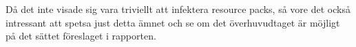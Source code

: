 \documentclass[journal,comsoc]{IEEEtran}
\begin{document}
Då det inte visade sig vara triviellt att infektera resource packs, så vore det också intressant att spetsa just detta ämnet och se om det överhuvudtaget är möjligt på det sättet föreslaget i rapporten. 

%
%



%
%
\end{document}
